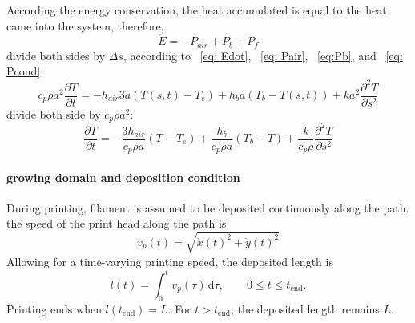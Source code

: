 \documentclass{article}
\begin{document}
According the energy conservation, the heat accumulated is equal to the heat came into the system, therefore,
\begin{equation}
\dot {E} =-P_{air}+P_b+P_f
\label{eq:eb}
\end{equation}
divide both sides by $\Delta s$, according to ~\eqref{eq: Edot}, ~\eqref{eq: Pair}, ~\eqref{eq:Pb}, and ~\eqref{eq: Pcond}:
\begin{equation}
c_p \rho a^2 \frac{\partial T}{\partial t}
=-h_{air} 3a (T(s,t)-T_e)+h_b a (T_b-T(s,t))+ka^2\frac{\partial^2 T}{\partial s^2}
\label{eq:energybalance}
\end{equation}
divide both side by $c_p\rho a^2$:
\begin{equation}
\frac{\partial T}{\partial t}
= -\frac{3h_{air}}{c_p\rho a}(T-T_e)
 +\frac{h_b}{c_p\rho a}(T_b-T)
 +\frac{k}{c_p \rho}\frac{\partial^2 T}{\partial s^2}
 \end{equation}

\paragraph{growing domain and deposition condition}

During printing, filament is assumed to be deposited continuously along the path. the speed of the print head along the path is 
\begin{equation}
v_p(t)=\sqrt{\dot{x}(t)^2+\dot{y}(t)^2}
\end{equation}
Allowing for a time-varying printing speed, the deposited length is 
\begin{equation}
l(t)=\int_0^tv_p(\tau)\,\mathrm{d}\tau,
\qquad
0\le t\le t_{\mathrm{end}}.
\end{equation}
Printing ends when $l(t_{\mathrm{end}})=L$.
For $t>t_{\mathrm{end}}$, the deposited length remains $L$. 
\end{document}

